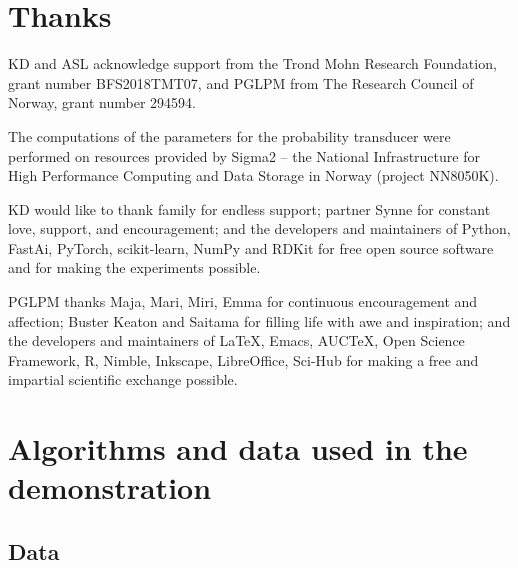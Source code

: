 \documentclass[\ifafour a4paper,12pt,\else a5paper,10pt,\fi%
onecolumn,oneside,article,%
british%
]{memoir}
\theoremstyle{remark}
\theoremstyle{innote}
\newenvironment{acknowledgements}{\section*{Thanks}\addcontentsline{toc}{section}{Thanks}}{\par}
\newcommand*\autanet{\texttt{[image: autanet.pdf]}}
\renewcommand*{\|}[1][]{\nonscript\:#1\vert\nonscript\:\mathopen{}}
\begin{document}
\begin{acknowledgements}
  KD and ASL acknowledge support from the Trond Mohn Research Foundation, grant number BFS2018TMT07, and PGLPM from The Research Council of Norway, grant number 294594.

  The computations of the parameters for the probability transducer were performed on resources provided by Sigma2 -- the National Infrastructure for High Performance Computing and Data Storage in Norway (project NN8050K).

  KD would like to thank family for endless support; partner Synne for constant love, support, and encouragement; and the developers and maintainers of Python, FastAi, PyTorch, scikit-learn, NumPy and RDKit for free open source software and for making the experiments possible. 

  PGLPM thanks Maja, Mari, Miri, Emma for continuous encouragement and affection;  Buster Keaton and Saitama for filling life with awe and inspiration; and the developers and maintainers of \LaTeX, Emacs, AUC\TeX, Open Science Framework, R, Nimble, Inkscape, LibreOffice, Sci-Hub for making a free and impartial scientific exchange possible.
\end{acknowledgements}



\clearpage

\renewcommand*{\appendixpagename}{Appendices: mathematical and technical details}
\appendix



\section{Algorithms and data used in the demonstration}
\label{sec:appendix_algorithms} 

\subsection{Data} 
  
\end{document}

